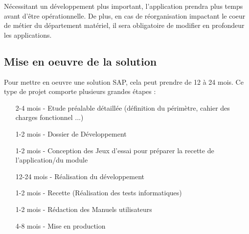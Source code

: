 Nécessitant un développement plus important, l'application prendra plus temps
avant d'être opérationnelle. De plus, en cas de réorganisation
impactant le coeur de métier du département matériel, il sera obligatoire de modifier
en profondeur les applications. 

\subsection{Mise en oeuvre de la solution}
Pour mettre en oeuvre une solution SAP, cela peut prendre de 12 à 24 mois.
Ce type de projet comporte plusieurs grandes étapes :

\begin{itemize}
	\item[2-4 mois -] Etude préalable détaillée (définition du périmètre, cahier des charges fonctionnel ...)
	\item[1-2 mois -] Dossier de Développement
	\item[1-2 mois -] Conception des Jeux d’essai pour préparer la recette de l'application/du module
	\item[12-24 mois -] Réalisation du développement
	\item[1-2 mois -] Recette (Réalisation des tests informatiques)
	\item[1-2 mois -] Rédaction des Manuels utilisateurs
	\item[4-8 mois -] Mise en production
\end{itemize}
